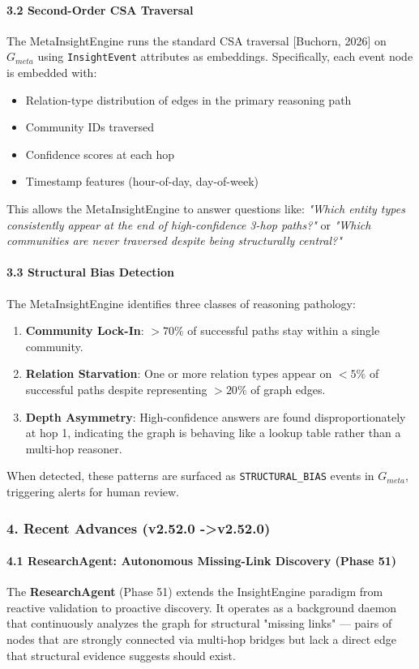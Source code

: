 \paragraph{3.2 Second-Order CSA Traversal}
The MetaInsightEngine runs the standard CSA traversal [Buchorn, 2026] on $G_{meta}$ using \texttt{InsightEvent} attributes as embeddings. Specif\-ically, each event node is embedded with:
\begin{itemize}
\item Relation-type distr\-ibution of edges in the primary reasoning path
\item Community IDs traversed
\item Confidence scores at each hop
\item Timestamp features (hour-of-day, day-of-week)

\end{itemize}
This allows the MetaInsightEngine to answer questions like: \textit{"Which entity types consi\-stently appear at the end of high-confidence 3-hop paths?"} or \textit{"Which communities are never traversed despite being struc\-turally central?"}

\paragraph{3.3 Structural Bias Detection}
The MetaInsightEngine identifies three classes of reasoning pathology:
\begin{enumerate}
\item \textbf{Community Lock-In}: $> 70\%$ of successful paths stay within a single community.
\item \textbf{Relation Starvation}: One or more relation types appear on $< 5\%$ of successful paths despite repre\-senting $> 20\%$ of graph edges.
\item \textbf{Depth Asymmetry}: High-confidence answers are found dispr\-oportionately at hop 1, indicating the graph is behaving like a lookup table rather than a multi-hop reasoner.

\end{enumerate}
When detected, these patterns are surfaced as \texttt{STRUCTURAL\_BIAS} events in $G_{meta}$, triggering alerts for human review.

\subsubsection{4. Recent Advances (v2.52.0 -\textgreater  v2.52.0)}

\paragraph{4.1 ResearchAgent: Autonomous Missing-Link Discovery (Phase 51)}
The \textbf{ResearchAgent} (Phase 51) extends the InsightEngine paradigm from reactive validation to proactive discovery. It operates as a background daemon that conti\-nuously analyzes the graph for structural "missing links" — pairs of nodes that are strongly connected via multi-hop bridges but lack a direct edge that structural evidence suggests should exist.

